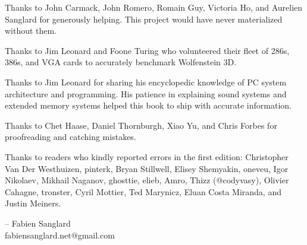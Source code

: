Thanks to John Carmack, John Romero, Romain Guy, Victoria Ho, and Aurelien Sanglard for generously helping. This project would have never
materialized without them.\\ 
\par
Thanks to  Jim Leonard and Foone Turing who volunteered their fleet of 286s, 386s, and VGA cards to accurately benchmark Wolfenstein 3D.\\
\par
Thanks to  Jim Leonard for sharing his encyclopedic knowledge of PC system architecture and programming. His patience in explaining sound systems and extended memory systems helped this book to ship with accurate information.\\
\par
Thanks to  Chet Haase, Daniel Thornburgh, Xiao Yu, and Chris Forbes for proofreading and catching mistakes.\\
\par
Thanks to readers who kindly reported errors in the first edition: Christopher Van Der Westhuizen, pinterk, Bryan Stillwell, Elisey Shemyakin, oneveu, Igor Nikolaev, Mikhail Naganov, ghosttie, elieb, Amro, Thizz (@codyvasy), Olivier Cahagne, tronster, Cyril Mottier, Ted Marynicz, 
Eluan Costa Miranda, and Justin Meiners.\\
\par
-- Fabien Sanglard\\
fabiensanglard.net@gmail.com
\thispagestyle{plain} %

